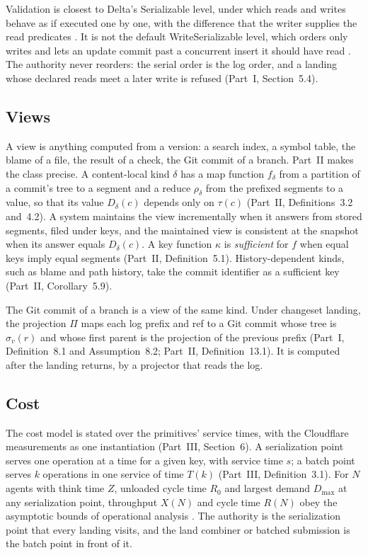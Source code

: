 \documentclass[11pt,letterpaper]{article}
\theoremstyle{definition}
\theoremstyle{remark}
\newcommand{\tree}{\tau}
\begin{document}
Validation is closest to Delta's Serializable level, under which reads and writes behave as if executed one by one, with the difference that the writer supplies the read predicates \cite{deltaisolationsrc}. It is not the default WriteSerializable level, which orders only writes and lets an update commit past a concurrent insert it should have read \cite{deltaisolationsrc}. The authority never reorders: the serial order is the log order, and a landing whose declared reads meet a later write is refused (Part~I, Section~5.4).

\subsection{Views}

A view is anything computed from a version: a search index, a symbol table, the blame of a file, the result of a check, the Git commit of a branch. Part~II makes the class precise. A content-local kind $\delta$ has a map function $f_\delta$ from a partition of a commit's tree to a segment and a reduce $\rho_\delta$ from the prefixed segments to a value, so that its value $D_\delta(c)$ depends only on $\tree(c)$ (Part~II, Definitions~3.2 and~4.2). A system maintains the view incrementally when it answers from stored segments, filed under keys, and the maintained view is consistent at the snapshot when its answer equals $D_\delta(c)$. A key function $\kappa$ is \emph{sufficient} for $f$ when equal keys imply equal segments (Part~II, Definition~5.1). History-dependent kinds, such as blame and path history, take the commit identifier as a sufficient key (Part~II, Corollary~5.9).

The Git commit of a branch is a view of the same kind. Under changeset landing, the projection $\Pi$ maps each log prefix and ref to a Git commit whose tree is $\sigma_v(r)$ and whose first parent is the projection of the previous prefix (Part~I, Definition~8.1 and Assumption~8.2; Part~II, Definition~13.1). It is computed after the landing returns, by a projector that reads the log.

\subsection{Cost}

The cost model is stated over the primitives' service times, with the Cloudflare measurements as one instantiation (Part~III, Section~6). A serialization point serves one operation at a time for a given key, with service time $s$; a batch point serves $k$ operations in one service of time $T(k)$ (Part~III, Definition~3.1). For $N$ agents with think time $Z$, unloaded cycle time $R_0$ and largest demand $D_{\max}$ at any serialization point, throughput $X(N)$ and cycle time $R(N)$ obey the asymptotic bounds of operational analysis \cite{denning1978operational,lazowska1984qsp}. The authority is the serialization point that every landing visits, and the land combiner or batched submission is the batch point in front of it.
\end{document}
